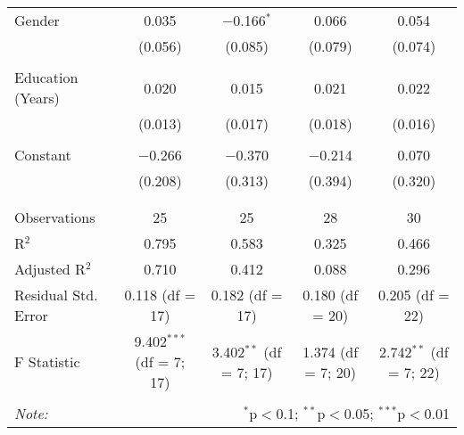 \begin{table}[!htbp]
\begin{tabular}{@{\extracolsep{5pt}}lcccc}
 Gender & 0.035 & $-$0.166$^{*}$ & 0.066 & 0.054 \\ 
  & (0.056) & (0.085) & (0.079) & (0.074) \\ 
  & & & & \\ 
 Education (Years) & 0.020 & 0.015 & 0.021 & 0.022 \\ 
  & (0.013) & (0.017) & (0.018) & (0.016) \\ 
  & & & & \\ 
 Constant & $-$0.266 & $-$0.370 & $-$0.214 & 0.070 \\ 
  & (0.208) & (0.313) & (0.394) & (0.320) \\ 
  & & & & \\ 
\hline \\[-1.8ex] 
Observations & 25 & 25 & 28 & 30 \\ 
R$^{2}$ & 0.795 & 0.583 & 0.325 & 0.466 \\ 
Adjusted R$^{2}$ & 0.710 & 0.412 & 0.088 & 0.296 \\ 
Residual Std. Error & 0.118 (df = 17) & 0.182 (df = 17) & 0.180 (df = 20) & 0.205 (df = 22) \\ 
F Statistic & 9.402$^{***}$ (df = 7; 17) & 3.402$^{**}$ (df = 7; 17) & 1.374 (df = 7; 20) & 2.742$^{**}$ (df = 7; 22) \\ 
\hline 
\hline \\[-1.8ex] 
\textit{Note:}  & \multicolumn{4}{r}{$^{*}$p$<$0.1; $^{**}$p$<$0.05; $^{***}$p$<$0.01} \\ 
\end{tabular} 
\end{table} 
